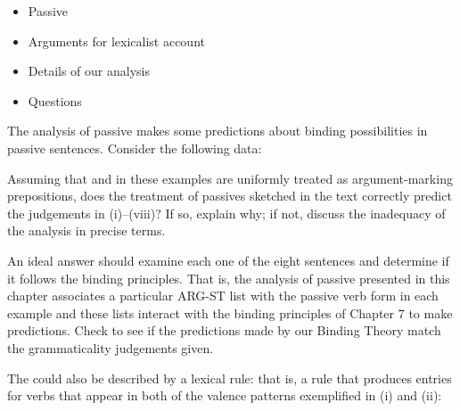 \documentclass[a4paper,landscape,headrule,footrule,dvips]{foils}
\begin{document}
\begin{itemize}
\item Passive
\item Arguments for lexicalist account
\item Details of our analysis
\item Questions
\end{itemize}


The analysis of passive makes some predictions about binding possibilities
in passive sentences. Consider the following data:

\begin{exe}
 
 \bad {}
 
 \bad {}
 
 \bad {}
 
 \bad {}
\end{exe}

\noindent
Assuming that  and  in these examples are uniformly
treated as  argument-marking prepositions, 
does the treatment of passives sketched in the text
correctly predict the judgements in (i)--(viii)?
If so, explain why; if not, discuss the inadequacy of the analysis in
precise terms. 

An ideal answer should examine each one of the eight sentences and determine
if it follows the binding principles. That is, the analysis of passive
presented in this chapter associates a particular ARG-ST list with the passive
verb form in each example and these lists interact with the binding principles
of Chapter 7 to make predictions. Check to see if the predictions made by our
Binding Theory match the grammaticality judgements given. 


The  could also be described by a lexical
rule: that is, a rule that produces entries for verbs that appear in
both of the valence patterns exemplified in (i) and (ii):
\end{document}
